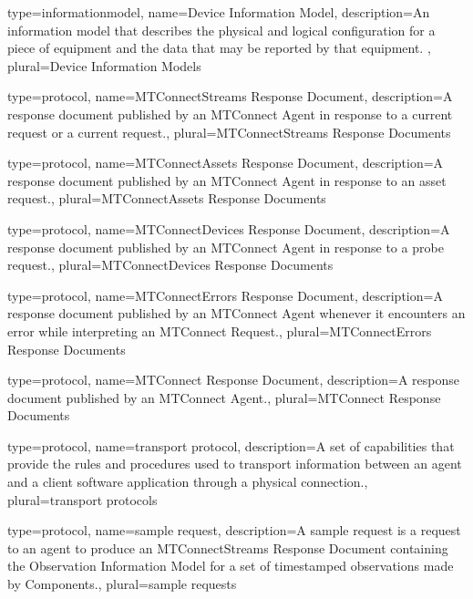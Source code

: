 {
	type={informationmodel},
    name={Device Information Model},
	description={An \gls{information model} that describes the physical and logical configuration for a piece of equipment and the data that may be reported by that equipment. },
	plural={Device Information Models}
}

{
	type={protocol},
    name={MTConnectStreams Response Document},
	description={A \gls{response document} published by an \gls{MTConnect Agent} in response to a \gls{current request} or a \gls{current request}.},
	plural={MTConnectStreams Response Documents}
}

{
	type={protocol},
    name={MTConnectAssets Response Document},
	description={A \gls{response document} published by an \gls{MTConnect Agent} in response to an \gls{asset request}.},
	plural={MTConnectAssets Response Documents}
}

{
	type={protocol},
    name={MTConnectDevices Response Document},
	description={A \gls{response document} published by an \gls{MTConnect Agent} in response to a \gls{probe request}.},
	plural={MTConnectDevices Response Documents}
}

{
	type={protocol},
    name={MTConnectErrors Response Document},
	description={A \gls{response document} published by an \gls{MTConnect Agent} whenever it encounters an error while interpreting an \gls{MTConnect Request}.},
	plural={MTConnectErrors Response Documents}
}

{
	type={protocol},
    name={MTConnect Response Document},
	description={A \gls{response document} published by an \gls{MTConnect Agent}.},
	plural={MTConnect Response Documents}
}

{
	type={protocol},
    name={transport protocol},
	description={A set of capabilities that provide the rules and procedures used to transport information between an \gls{agent} and a client software application through a \gls{physical connection}.},
	plural={transport protocols}
}

{
	type={protocol},
    name={sample request},
	description={A \gls{sample request} is a \gls{request} to an \gls{agent} to produce an \gls{MTConnectStreams Response Document} containing the \gls{Observation Information Model} for a set of timestamped \glspl{observation} made by \glspl{Component}.},
	plural={sample requests}
}

